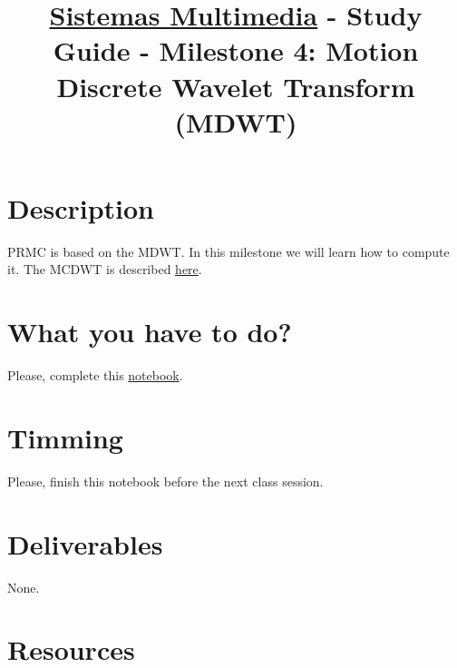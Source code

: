 \title{\href{http://cms.ual.es/UAL/estudios/masteres/plandeestudios/asignaturas/asignatura/MASTER7114?idAss=71142105&idTit=7114}{Sistemas Multimedia} - Study Guide - Milestone 4: Motion Discrete Wavelet Transform (MDWT)}

\maketitle

\section{Description}

PRMC is based on the MDWT. In this milestone we will learn how to
compute it. The MCDWT is described
\href{https://sistemas-multimedia.github.io/PRMC/#x1-100005}{here}.

\section{What you have to do?}
  
Please, complete this
\href{https://github.com/Sistemas-Multimedia/Sistemas-Multimedia.github.io/blob/master/study_guide/MDWT/MDWT.ipynb}{notebook}.

\section{Timming}

Please, finish this notebook before the next class session.

\section{Deliverables}

None.

\section{Resources}


